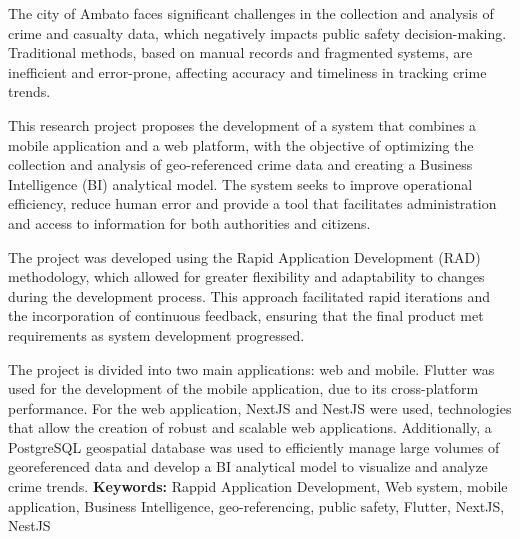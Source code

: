 \newpage
{}
The city of Ambato faces significant challenges in the collection and analysis of crime and casualty data,
which negatively impacts public safety decision-making. Traditional methods, based on manual records and
fragmented systems, are inefficient and error-prone, affecting accuracy and timeliness in tracking crime trends.
\bigbreak

This research project proposes the development of a system that combines a mobile application and a web platform,
with the objective of optimizing the collection and analysis of geo-referenced crime data and creating a Business
Intelligence (BI) analytical model. The system seeks to improve operational efficiency, reduce human error and provide
a tool that facilitates administration and access to information for both authorities and citizens.
\bigbreak

The project was developed using the Rapid Application Development (RAD) methodology, which allowed for greater flexibility
and adaptability to changes during the development process. This approach facilitated rapid iterations and the incorporation
of continuous feedback, ensuring that the final product met requirements as system development progressed.
\bigbreak

The project is divided into two main applications: web and mobile. Flutter was used for the development of the mobile
application, due to its cross-platform performance. For the web application, NextJS and NestJS were used, technologies
that allow the creation of robust and scalable web applications. Additionally, a PostgreSQL geospatial database was
used to efficiently manage large volumes of georeferenced data and develop a BI analytical model to visualize and
analyze crime trends.
\vfill
\textbf{Keywords:} Rappid Application Development, Web system, mobile application, Business Intelligence,
geo-referencing, public safety, Flutter, NextJS, NestJS
